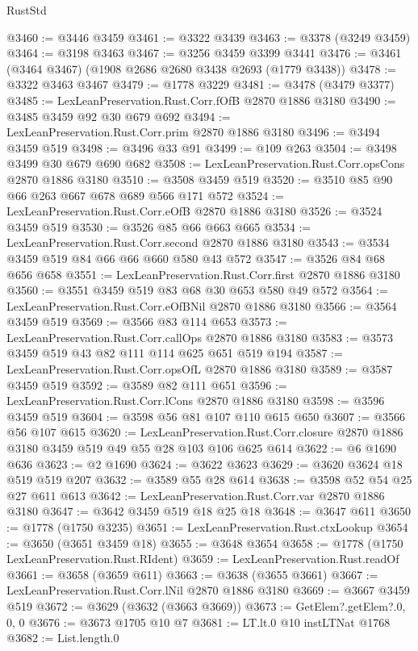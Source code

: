 \begin{lexlean}{RustStd}
\begin{coremodule}
@3460 := @3446 @3459
@3461 := @3322 @3439
@3463 := @3378 (@3249 @3459)
@3464 := @3198 @3463
@3467 := @3256 @3459 @3399 @3441
@3476 := @3461 (@3464 @3467) (@1908 @2686 @2680 @3438 @2693 (@1779 @3438))
@3478 := @3322 @3463 @3467
@3479 := @1778 @3229
@3481 := @3478 (@3479 @3377)
@3485 := LexLeanPreservation.Rust.Corr.fOfB @2870 @1886 @3180
@3490 := @3485 @3459 @92 @30 @679 @692
@3494 := LexLeanPreservation.Rust.Corr.prim @2870 @1886 @3180
@3496 := @3494 @3459 @519
@3498 := @3496 @33 @91
@3499 := @109 @263
@3504 := @3498 @3499 @30 @679 @690 @682
@3508 := LexLeanPreservation.Rust.Corr.opsCons @2870 @1886 @3180
@3510 := @3508 @3459 @519
@3520 := @3510 @85 @90 @66 @263 @667 @678 @689 @566 @171 @572
@3524 := LexLeanPreservation.Rust.Corr.eOfB @2870 @1886 @3180
@3526 := @3524 @3459 @519
@3530 := @3526 @85 @66 @663 @665
@3534 := LexLeanPreservation.Rust.Corr.second @2870 @1886 @3180
@3543 := @3534 @3459 @519 @84 @66 @66 @660 @580 @43 @572
@3547 := @3526 @84 @68 @656 @658
@3551 := LexLeanPreservation.Rust.Corr.first @2870 @1886 @3180
@3560 := @3551 @3459 @519 @83 @68 @30 @653 @580 @49 @572
@3564 := LexLeanPreservation.Rust.Corr.eOfBNil @2870 @1886 @3180
@3566 := @3564 @3459 @519
@3569 := @3566 @83 @114 @653
@3573 := LexLeanPreservation.Rust.Corr.callOps @2870 @1886 @3180
@3583 := @3573 @3459 @519 @43 @82 @111 @114 @625 @651 @519 @194
@3587 := LexLeanPreservation.Rust.Corr.opsOfL @2870 @1886 @3180
@3589 := @3587 @3459 @519
@3592 := @3589 @82 @111 @651
@3596 := LexLeanPreservation.Rust.Corr.lCons @2870 @1886 @3180
@3598 := @3596 @3459 @519
@3604 := @3598 @56 @81 @107 @110 @615 @650
@3607 := @3566 @56 @107 @615
@3620 := LexLeanPreservation.Rust.Corr.closure
    @2870
    @1886
    @3180
    @3459
    @519
    @49
    @55
    @28
    @103
    @106
    @625
    @614
@3622 := @6 @1690 @636
@3623 := @2 @1690
@3624 := @3622 @3623
@3629 := @3620 @3624 @18 @519 @519 @207
@3632 := @3589 @55 @28 @614
@3638 := @3598 @52 @54 @25 @27 @611 @613
@3642 := LexLeanPreservation.Rust.Corr.var @2870 @1886 @3180
@3647 := @3642 @3459 @519 @18 @25 @18
@3648 := @3647 @611
@3650 := @1778 (@1750 @3235)
@3651 := LexLeanPreservation.Rust.ctxLookup
@3654 := @3650 (@3651 @3459 @18)
@3655 := @3648 @3654
@3658 := @1778 (@1750 LexLeanPreservation.Rust.RIdent)
@3659 := LexLeanPreservation.Rust.readOf
@3661 := @3658 (@3659 @611)
@3663 := @3638 (@3655 @3661)
@3667 := LexLeanPreservation.Rust.Corr.lNil @2870 @1886 @3180
@3669 := @3667 @3459 @519
@3672 := @3629 (@3632 (@3663 @3669))
@3673 := GetElem?.getElem?.{0, 0, 0}
@3676 := @3673 @1705 @10 @7
@3681 := LT.lt.{0} @10 instLTNat @1768
@3682 := List.length.{0}

\end{coremodule}
\end{lexlean}
